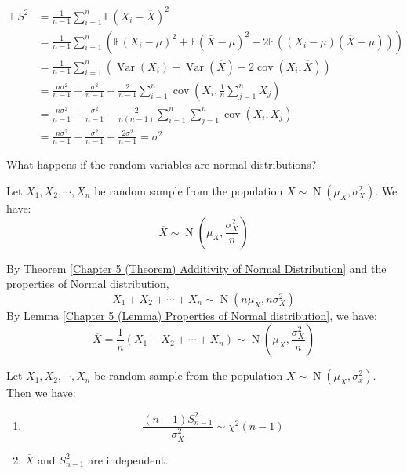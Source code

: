 \documentclass{huhtakm-template-book}
\newcommand{\expect}{\mathbb{E}}
\DeclareMathOperator{\N}{N}
\DeclareMathOperator{\Var}{Var}
\DeclareMathOperator{\cov}{cov}
\begin{document}
\begin{proofing}
	\begin{align*}
		\expect{S^{2}}&=\frac{1}{n-1}\sum_{i=1}^{n}\expect(X_{i}-\overline{X})^{2}\\
		&=\frac{1}{n-1}\sum_{i=1}^{n}(\expect(X_{i}-\mu)^{2}+\expect(\overline{X}-\mu)^{2}-2\expect((X_{i}-\mu)(\overline{X}-\mu)))\\
		&=\frac{1}{n-1}\sum_{i=1}^{n}(\Var(X_{i})+\Var(\overline{X})-2\cov(X_{i},\overline{X}))\\
		&=\frac{n\sigma^{2}}{n-1}+\frac{\sigma^{2}}{n-1}-\frac{2}{n-1}\sum_{i=1}^{n}\cov\left(X_{i},\frac{1}{n}\sum_{j=1}^{n}X_{j}\right)\\
		&=\frac{n\sigma^{2}}{n-1}+\frac{\sigma^{2}}{n-1}-\frac{2}{n(n-1)}\sum_{i=1}^{n}\sum_{j=1}^{n}\cov(X_{i},X_{j})\\
		&=\frac{n\sigma^{2}}{n-1}+\frac{\sigma^{2}}{n-1}-\frac{2\sigma^{2}}{n-1}=\sigma^{2}
	\end{align*}
\end{proofing}
What happens if the random variables are normal distributions?
\begin{thm}
	\label{Chapter 6 (Theorem) Sampling distribution with sample mean}
	Let $X_{1},X_{2},\cdots,X_{n}$ be random sample from the population $X\sim\N(\mu_{X},\sigma_{X}^{2})$. We have:
	\begin{equation*}
		\overline{X}\sim\N\left(\mu_{X},\frac{\sigma_{X}^{2}}{n}\right)
	\end{equation*}
\end{thm}
\begin{proofing}
	By Theorem \ref{Chapter 5 (Theorem) Additivity of Normal Distribution} and the properties of Normal distribution,
	\begin{equation*}
		X_{1}+X_{2}+\cdots+X_{n}\sim\N(n\mu_{X},n\sigma_{X}^{2})
	\end{equation*}
	By Lemma \ref{Chapter 5 (Lemma) Properties of Normal distribution}, we have:
	\begin{equation*}
		\overline{X}=\frac{1}{n}(X_{1}+X_{2}+\cdots+X_{n})\sim\N\left(\mu_{X},\frac{\sigma_{X}^{2}}{n}\right)
	\end{equation*}
\end{proofing}
\begin{thm}
	\label{Chapter 6 (Theorem) Sampling distribution with sample variance}
	Let $X_{1},X_{2},\cdots,X_{n}$ be random sample from the population $X\sim\N(\mu_{X},\sigma_{x}^{2})$. Then we have:
	\begin{enumerate}
		\item \begin{equation*}
			\frac{(n-1)S_{n-1}^{2}}{\sigma_{X}^{2}}\sim\chi^{2}(n-1)
		\end{equation*}
		\item $\overline{X}$ and $S_{n-1}^{2}$ are independent.
	\end{enumerate}
\end{thm}
\end{document}
